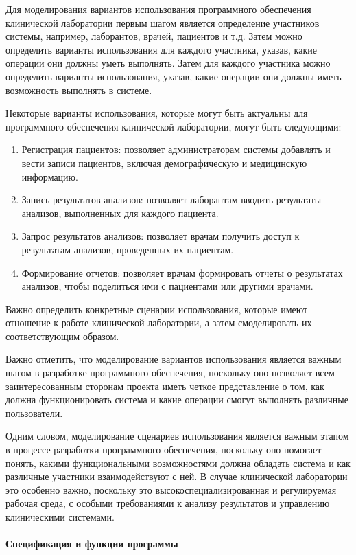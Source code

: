 Для моделирования вариантов использования программного обеспечения клинической лаборатории первым шагом является определение участников системы, например, лаборантов, врачей, пациентов и т.д. Затем можно определить варианты использования для каждого участника, указав, какие операции они должны уметь выполнять. Затем для каждого участника можно определить варианты использования, указав, какие операции они должны иметь возможность выполнять в системе.

Некоторые варианты использования, которые могут быть актуальны для программного обеспечения клинической лаборатории, могут быть следующими:
\begin{enumerate}
\item Регистрация пациентов: позволяет администраторам системы добавлять и вести записи пациентов, включая демографическую и медицинскую информацию.
\item Запись результатов анализов: позволяет лаборантам вводить результаты анализов, выполненных для каждого пациента.
\item Запрос результатов анализов: позволяет врачам получить доступ к результатам анализов, проведенных их пациентам.
\item Формирование отчетов: позволяет врачам формировать отчеты о результатах анализов, чтобы поделиться ими с пациентами или другими врачами.
\end{enumerate}

Важно определить конкретные сценарии использования, которые имеют отношение к работе клинической лаборатории, а затем смоделировать их соответствующим образом. 

Важно отметить, что моделирование вариантов использования является важным шагом в разработке программного обеспечения, поскольку оно позволяет всем заинтересованным сторонам проекта иметь четкое представление о том, как должна функционировать система и какие операции смогут выполнять различные пользователи.

Одним словом, моделирование сценариев использования является важным этапом в процессе разработки программного обеспечения, поскольку оно помогает понять, какими функциональными возможностями должна обладать система и как различные участники взаимодействуют с ней. В случае клинической лаборатории это особенно важно, поскольку это высокоспециализированная и регулируемая рабочая среда, с особыми требованиями к анализу результатов и управлению клиническими системами.

\paragraph{Спецификация и функции программы}

